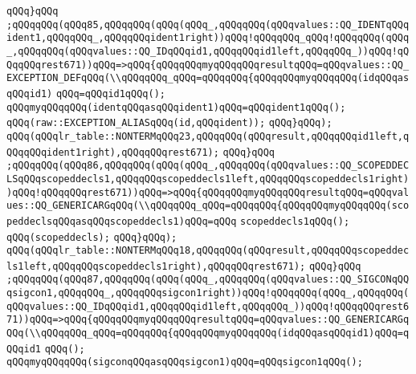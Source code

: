 \verb|qQQq}qQQq|\newline
\verb|;qQQqqQQq(qQQq85,qQQqqQQq(qQQq(qQQq_,qQQqqQQq(qQQqvalues::QQ_IDENTqQQqident1,qQQqqQQq_,qQQqqQQqident1right))qQQq!qQQqqQQq_qQQq!qQQqqQQq(qQQq_,qQQqqQQq(qQQqvalues::QQ_IDqQQqid1,qQQqqQQqid1left,qQQqqQQq_))qQQq!qQQqqQQqrest671))qQQq=>qQQq{qQQqqQQqmyqQQqqQQqresultqQQq=qQQqvalues::QQ_EXCEPTION_DEFqQQq(\\qQQqqQQq_qQQq=qQQqqQQq{qQQqqQQqmyqQQqqQQq(idqQQqasqQQqid1)|\newline
\verb|qQQq=qQQqid1qQQq();|\newline
\verb|qQQqmyqQQqqQQq(identqQQqasqQQqident1)qQQq=qQQqident1qQQq();|\newline
\verb|qQQq(raw::EXCEPTION_ALIASqQQq(id,qQQqident));|\newline
\verb|qQQq}qQQq);|\newline
\verb|qQQq(qQQqlr_table::NONTERMqQQq23,qQQqqQQq(qQQqresult,qQQqqQQqid1left,qQQqqQQqident1right),qQQqqQQqrest671);|\newline
\verb|qQQq}qQQq|\newline
\verb|;qQQqqQQq(qQQq86,qQQqqQQq(qQQq(qQQq_,qQQqqQQq(qQQqvalues::QQ_SCOPEDDECLSqQQqscopeddecls1,qQQqqQQqscopeddecls1left,qQQqqQQqscopeddecls1right))qQQq!qQQqqQQqrest671))qQQq=>qQQq{qQQqqQQqmyqQQqqQQqresultqQQq=qQQqvalues::QQ_GENERICARGqQQq(\\qQQqqQQq_qQQq=qQQqqQQq{qQQqqQQqmyqQQqqQQq(scopeddeclsqQQqasqQQqscopeddecls1)qQQq=qQQq|\newline
\verb|scopeddecls1qQQq();|\newline
\verb|qQQq(scopeddecls);|\newline
\verb|qQQq}qQQq);|\newline
\verb|qQQq(qQQqlr_table::NONTERMqQQq18,qQQqqQQq(qQQqresult,qQQqqQQqscopeddecls1left,qQQqqQQqscopeddecls1right),qQQqqQQqrest671);|\newline
\verb|qQQq}qQQq|\newline
\verb|;qQQqqQQq(qQQq87,qQQqqQQq(qQQq(qQQq_,qQQqqQQq(qQQqvalues::QQ_SIGCONqQQqsigcon1,qQQqqQQq_,qQQqqQQqsigcon1right))qQQq!qQQqqQQq(qQQq_,qQQqqQQq(qQQqvalues::QQ_IDqQQqid1,qQQqqQQqid1left,qQQqqQQq_))qQQq!qQQqqQQqrest671))qQQq=>qQQq{qQQqqQQqmyqQQqqQQqresultqQQq=qQQqvalues::QQ_GENERICARGqQQq(\\qQQqqQQq_qQQq=qQQqqQQq{qQQqqQQqmyqQQqqQQq(idqQQqasqQQqid1)qQQq=qQQqid1|\newline
\verb|qQQq();|\newline
\verb|qQQqmyqQQqqQQq(sigconqQQqasqQQqsigcon1)qQQq=qQQqsigcon1qQQq();|\newline

